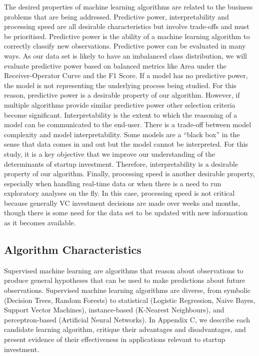 \documentclass[../thesis/thesis.tex]{subfiles}
\begin{document}
\begin{refsection}
The desired properties of machine learning algorithms are related to the business problems that are being addressed. Predictive power, interpretability and processing speed are all desirable characteristics but involve trade-offs and must be prioritised. Predictive power is the ability of a machine learning algorithm to correctly classify new observations. Predictive power can be evaluated in many ways. As our data set is likely to have an imbalanced class distribution, we will evaluate predictive power based on balanced metrics like Area under the Receiver-Operator Curve and the F1 Score. If a model has no predictive power, the model is not representing the underlying process being studied. For this reason, predictive power is a desirable property of our algorithm. However, if multiple algorithms provide similar predictive power other selection criteria become significant. Interpretability is the extent to which the reasoning of a model can be communicated to the end-user. There is a trade-off between model complexity and model interpretability. Some models are a ``black box'' in the sense that data comes in and out but the model cannot be interpreted. For this study, it is a key objective that we improve our understanding of the determinants of startup investment. Therefore, interpretability is a desirable property of our algorithm. Finally, processing speed is another desirable property, especially when handling real-time data or when there is a need to run exploratory analyses on the fly. In this case, processing speed is not critical because generally VC investment decisions are made over weeks and months, though there is some need for the data set to be updated with new information as it becomes available.

\subsection{Algorithm Characteristics}

Supervised machine learning are algorithms that reason about observations to produce general hypotheses that can be used to make predictions about future observations. Supervised machine learning algorithms are diverse, from symbolic (Decision Trees, Random Forests) to statistical (Logistic Regression, Naive Bayes, Support Vector Machines), instance-based (K-Nearest Neighbours), and perceptron-based (Artificial Neural Networks). In Appendix C, we describe each candidate learning algorithm, critique their advantages and disadvantages, and present evidence of their effectiveness in applications relevant to startup investment.


\end{refsection}
\end{document}
